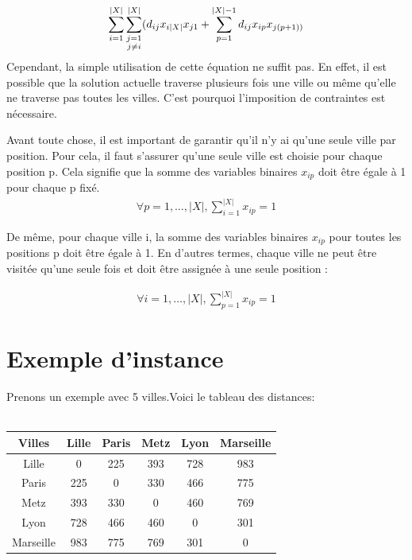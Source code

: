 \documentclass{article}
\begin{document}
        \begin{equation*}
           \sum_{i=1}^{|X|}\sum_{\substack{j=1 \\ j\neq i }}^{|X|}(d_{ij}x_{i|X|}x_{j1}+ \sum_{p=1}^{|X|-1}d_{ij}x_{ip}x_{j(p+1))}\\
        \end{equation*}
        Cependant, la simple utilisation de cette équation ne suffit pas.
        En effet, il est possible que la solution actuelle traverse plusieurs fois une ville ou même qu'elle ne traverse pas toutes les villes. C'est pourquoi l'imposition de contraintes est nécessaire.

        Avant toute chose, il est important de garantir qu'il n'y ai qu'une seule ville par position. Pour cela, il faut s'assurer qu'une seule ville est choisie pour chaque position p. Cela signifie que la somme des variables binaires $x_{ip}$ doit être égale à 1 pour chaque p fixé.
        \begin{equation*}
            \begin{aligned}
                \forall p=1,\dots,|X| ,\sum_{i=1}^{|X|}x_{ip} = 1
            \end{aligned}
        \end{equation*}

        De même, pour chaque ville i, la somme des variables binaires $x_{ip}$ pour toutes les positions p doit être égale à 1. En d'autres termes, chaque ville ne peut être visitée qu'une seule fois et doit être assignée à une seule position :

        \begin{equation*}
            \begin{aligned}
                \forall i=1,\dots,|X| ,\sum_{p=1}^{|X|}x_{ip} = 1
            \end{aligned}
        \end{equation*}



        \section{Exemple d'instance}\label{sec:exemple-instance}

        Prenons un exemple avec 5 villes.Voici le tableau des distances:\\\\
        \begin{tabular}{|c|c|c|c|c|c|}
            \hline
            Villes & Lille & Paris & Metz & Lyon & Marseille \\
            \hline
            Lille & 0 & 225 & 393 & 728 & 983 \\
            \hline
            Paris & 225 & 0 & 330 & 466 & 775\\
            \hline
            Metz & 393 & 330 & 0 & 460 & 769 \\
            \hline
            Lyon & 728 & 466 & 460 & 0 & 301\\
            \hline
            Marseille & 983 & 775 & 769 & 301 & 0\\
            \hline
        \end{tabular}\\
\end{document}
